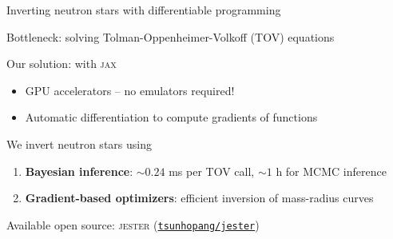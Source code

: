 \documentclass[usenames,dvipsnames,t]{beamer}
\begin{document}
\begin{frame}{Inverting neutron stars with differentiable programming}
  \def\x{3mm}
  \def\y{2mm}

  Bottleneck: solving Tolman-Oppenheimer-Volkoff (TOV) equations

  \vspace{\x}
  
  Our solution:  with \textsc{jax}~\cite{frostig2018compiling}
  \begin{itemize}
    \vspace{\x}
    
    \item GPU accelerators -- no emulators required!
    
    \vspace{\x}
    \item Automatic differentiation to compute gradients of functions
  \end{itemize}

  \vspace{\x}

  We invert neutron stars using
  \begin{enumerate}
    \vspace{\x}

    \item \textbf{Bayesian inference}: $\sim 0.24$ ms per TOV call, $\sim 1$ h for MCMC inference

    \vspace{\x}

    \item \textbf{Gradient-based optimizers}: efficient inversion of mass-radius curves
  \end{enumerate}

  \vspace{\x}
  
  Available open source: \textsc{jester} (\href{https://github.com/tsunhopang/jester}{{\faGithub \texttt{tsunhopang/jester}}})
\end{frame}
\end{document}
